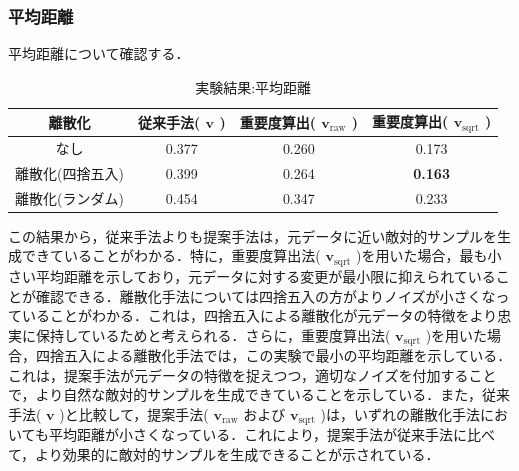 \subsubsection{平均距離}
平均距離について確認する．
\begin{table}[H]
    \centering
    \caption{実験結果:平均距離}
    \begin{tabular}{|c|c|c|c|} \hline
        離散化 & 従来手法( $\bm{v}$ ) & 重要度算出( $\bm{v}_{\mathrm{raw}}$ ) & 重要度算出( $\bm{v}_{\mathrm{sqrt}}$ ) \\ \hline
        なし & 0.377 & 0.260 & 0.173 \\ \hline
        離散化(四捨五入) & 0.399 & 0.264 & \textbf{0.163} \\ \hline
        離散化(ランダム) & 0.454 & 0.347 & 0.233 \\ \hline
    \end{tabular}
\end{table}
この結果から，従来手法よりも提案手法は，元データに近い敵対的サンプルを生成できていることがわかる．特に，重要度算出法( $\bm{v}_{\mathrm{sqrt}}$ )を用いた場合，最も小さい平均距離を示しており，元データに対する変更が最小限に抑えられていることが確認できる．離散化手法については四捨五入の方がよりノイズが小さくなっていることがわかる．これは，四捨五入による離散化が元データの特徴をより忠実に保持しているためと考えられる．さらに，重要度算出法( $\bm{v}_{\mathrm{sqrt}}$ )を用いた場合，四捨五入による離散化手法では，この実験で最小の平均距離を示している．これは，提案手法が元データの特徴を捉えつつ，適切なノイズを付加することで，より自然な敵対的サンプルを生成できていることを示している．また，従来手法( $\bm{v}$ )と比較して，提案手法( $\bm{v}_{\mathrm{raw}}$ および $\bm{v}_{\mathrm{sqrt}}$ )は，いずれの離散化手法においても平均距離が小さくなっている．これにより，提案手法が従来手法に比べて，より効果的に敵対的サンプルを生成できることが示されている．

